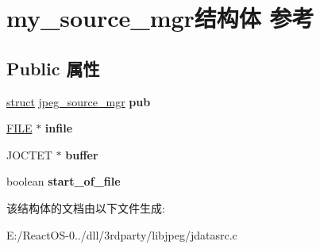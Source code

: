 \hypertarget{structmy__source__mgr}{}\section{my\+\_\+source\+\_\+mgr结构体 参考}
\label{structmy__source__mgr}
\subsection*{Public 属性}
\begin{DoxyCompactItemize}
\item 
\mbox{\label{structmy__source__mgr_a8572f33f87bec948592001edea12680f}} 
\hyperlink{interfacestruct}{struct} \hyperlink{structjpeg__source__mgr}{jpeg\+\_\+source\+\_\+mgr} {\bfseries pub}
\item 
\mbox{\label{structmy__source__mgr_a157a49dcdfd5723e566b1b8a35394a04}} 
\hyperlink{struct__iobuf}{F\+I\+LE} $\ast$ {\bfseries infile}
\item 
\mbox{\label{structmy__source__mgr_ab92bf51a7ca44e0d3909aeb21fb0b0f8}} 
J\+O\+C\+T\+ET $\ast$ {\bfseries buffer}
\item 
\mbox{\label{structmy__source__mgr_a5c505c9008db53bb3ce07ed8ae3872a9}} 
boolean {\bfseries start\+\_\+of\+\_\+file}
\end{DoxyCompactItemize}


该结构体的文档由以下文件生成\+:\begin{DoxyCompactItemize}
\item 
E\+:/\+React\+O\+S-\/0../dll/3rdparty/libjpeg/jdatasrc.\+c\end{DoxyCompactItemize}
